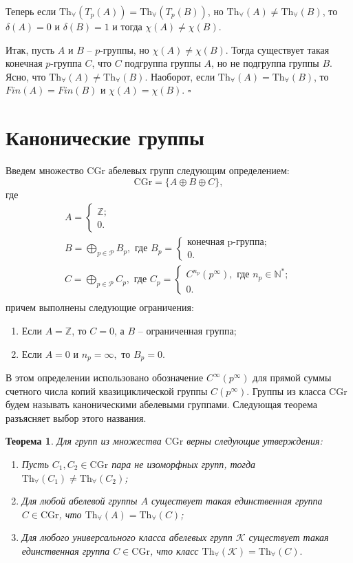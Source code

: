 \documentclass[a4paper,11pt,twoside]{article}
\newtheorem{theorem}{Теорема}[section]
\def\K{{\mathcal{K}}}
\def\P{{\mathcal{P}}}
\def\Z{{\mathbb{Z}}}
\def\N{{\mathbb{N}}}
\def\Tha{{\mathrm{Th}_\forall}}
\def\CG{{\mathrm{CGr}}}
\begin{document}
Теперь если $\Tha(T_p(A)) = \Tha(T_p(B))$, но $\Tha(A) \neq \Tha(B)$, то $\delta(A) = 0$ и $\delta(B) = 1$ и тогда $\chi(A) \neq \chi(B)$.

Итак, пусть $A$ и $B$ -- $p$-группы, но $\chi(A) \neq \chi(B)$. Тогда существует такая конечная $p$-группа $C$, что $C$ подгруппа группы $A$, но не подгруппа группы $B$. Ясно, что $\Tha(A) \neq \Tha(B)$. Наоборот, если $\Tha(A) = \Tha(B)$, то $Fin(A) = Fin(B)$ и $\chi(A) = \chi(B)$. $\square$

\section{Канонические группы}

Введем множество $\CG$ абелевых групп следующим определением:
$$\CG = \{A \oplus B \oplus C\},$$
где 
$$\begin{array}{c}
A = \left\lbrace \begin{array}{l} \Z; \\ 0.\end{array}\right. \\
B = \bigoplus\limits_{p \in \P} B_p, \text{ где } B_p = \left\lbrace \begin{array}{l} \text{конечная p-группа}; \\ 0.\end{array}\right. \\
C = \bigoplus\limits_{p \in \P} C_p, \text{ где } C_p = \left\lbrace \begin{array}{l} C^{n_p}(p^\infty), \text{ где } n_p \in \N^*; \\ 0.\end{array}\right. \\
\end{array}$$
причем выполнены следующие ограничения:
\begin{enumerate}
\item Если $A = \Z$, то $C = 0$, а $B$ -- ограниченная группа;
\item Если $A = 0$ и $n_p = \infty,$ то $B_p = 0$.
\end{enumerate}

В этом определении использовано обозначение $C^\infty(p^\infty)$ для прямой суммы счетного числа копий квазициклической группы $C(p^\infty)$. Группы из класса $\CG$ будем называть каноническими абелевыми группами. Следующая теорема разъясняет выбор этого названия.

\begin{theorem}Для групп из множества $\CG$ верны следующие утверждения:
\begin{enumerate}
\item Пусть $C_1, C_2 \in \CG$ пара не изоморфных групп, тогда $\Tha(C_1) \neq \Tha(C_2)$;
\item Для любой абелевой группы $A$ существует такая единственная группа $C \in \CG$, что $\Tha(A) = \Tha(C)$;
\item Для любого универсального класса абелевых групп $\K$ существует такая единственная группа $C \in \CG$, что класс $\Tha(\K) = \Tha(C).$
\end{enumerate}
\end{theorem}
\end{document}
